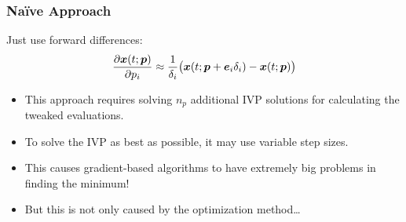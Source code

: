 			\subsubsection{Na{\"i}ve Approach} %
				Just use forward differences:
				\begin{align*}
					\pdv{\bm{x}(t; \bm{p})}{p_i} \approx \frac{1}{\delta_i} \big( \bm{x}(t; \bm{p} + \bm{e}_i \delta_i) - \bm{x}(t; \bm{p}) \big)
				\end{align*}
				\begin{itemize}
					\item This approach requires solving \(n_p\) additional IVP solutions for calculating the tweaked evaluations.
					\item To solve the IVP as best as possible, it may use variable step sizes.
					\item This causes gradient-based algorithms to have extremely big problems in finding the minimum!
					\item But this is not only caused by the optimization method\dots
				\end{itemize}

